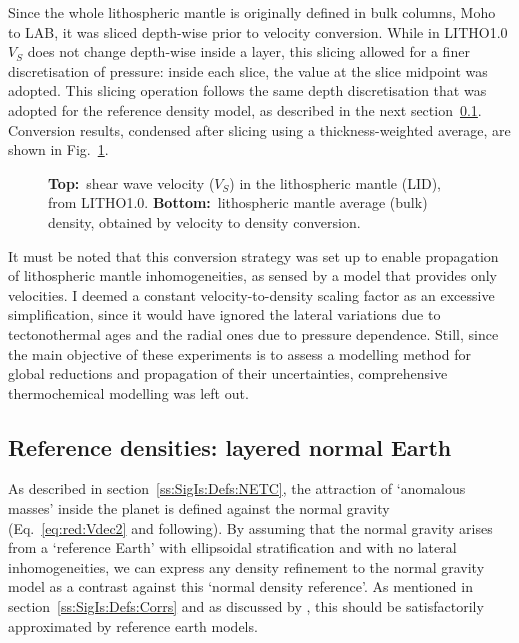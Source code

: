 Since the whole lithospheric mantle is originally defined in bulk columns, Moho to LAB, it was sliced depth-wise prior to velocity conversion.
While in {LITHO1.0} $V_S$ does not change depth-wise inside a layer, this slicing allowed for a finer discretisation of pressure: inside each slice, the value at the slice midpoint was adopted.
This slicing operation follows the same depth discretisation that was adopted for the reference density model, as described in the next section~\ref{ss:SigIs:InModels:REF}.
Conversion results, condensed after slicing using a thickness-weighted average, are shown in Fig.~\ref{fig:SigIs:LID_VS-density_map}.

\begin{figure}
    \begin{adjustbox}{center}
    \end{adjustbox}
    \caption[Density in the lithospheric mantle (LID) after conversion.]{
        \textbf{Top:}~shear wave velocity ($V_S$) in the lithospheric mantle (LID), from {LITHO1.0}. 
        \textbf{Bottom:}~lithospheric mantle average (bulk) density, obtained by velocity to density conversion.}
    \label{fig:SigIs:LID_VS-density_map}
\end{figure}

It must be noted that this conversion strategy was set up to enable propagation of lithospheric mantle inhomogeneities, as sensed by a model that provides only velocities.
I deemed a constant velocity-to-density scaling factor as an excessive simplification, since it would have ignored the lateral variations due to tectonothermal ages and the radial ones due to pressure dependence.
Still, since the main objective of these experiments is to assess a modelling method for global reductions and propagation of their uncertainties, comprehensive thermochemical modelling was left out.

\subsection{Reference densities: layered normal Earth}
\label{ss:SigIs:InModels:REF}

As described in section~\ref{ss:SigIs:Defs:NETC}, the attraction of `anomalous masses' inside the planet is defined against the normal gravity  (Eq.~\ref{eq:red:Vdec2} and following).
By assuming that the normal gravity arises from a `reference Earth' with ellipsoidal stratification and with no lateral inhomogeneities, we can express any density refinement to the normal gravity model as a contrast against this `normal density reference'.
As mentioned in section~\ref{ss:SigIs:Defs:Corrs} and as discussed by \textcite{Vajda2008}, this should be satisfactorily approximated by reference earth models. \nocite{Moritz1990} \nocite{Tscherning1981} %

